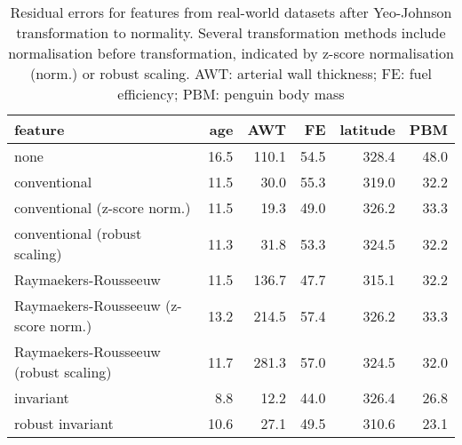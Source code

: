 \documentclass[
  a4paper,
]{article}
\begin{document}
\begin{table}
\begin{center}
\caption{Residual errors for features from real-world datasets after Yeo-Johnson transformation to normality. 
Several transformation methods include normalisation before transformation, indicated by z-score normalisation (norm.) or robust scaling. 
AWT: arterial wall thickness; FE: fuel efficiency; PBM: penguin body mass}
\label{tab:normalisation-before-transformation-appendix}
\begin{tabular}{l | r r r r r}

\toprule
feature & age & AWT & FE & latitude & PBM \\

\midrule
none & 16.5 & 110.1 & 54.5 & 328.4 & 48.0 \\
conventional & 11.5 & 30.0 & 55.3 & 319.0 & 32.2 \\
conventional (z-score norm.) & 11.5 & 19.3 & 49.0 & 326.2 & 33.3 \\
conventional (robust scaling) & 11.3 & 31.8 & 53.3 & 324.5 & 32.2 \\
Raymaekers-Rousseeuw & 11.5 & 136.7 & 47.7 & 315.1 & 32.2 \\
Raymaekers-Rousseeuw (z-score norm.) & 13.2 & 214.5 & 57.4 & 326.2 & 33.3 \\
Raymaekers-Rousseeuw (robust scaling) & 11.7 & 281.3 & 57.0 & 324.5 & 32.0 \\
invariant & 8.8 & 12.2 & 44.0 & 326.4 & 26.8 \\
robust invariant & 10.6 & 27.1 & 49.5 & 310.6 & 23.1 \\
\bottomrule
\end{tabular}
\end{center}
\end{table}
\end{document}
